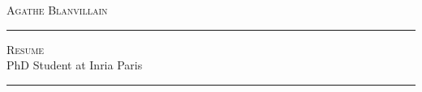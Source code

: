 \documentclass[10pt,A4]{article}
\newcommand{\cvsection}[1]
{
	\begin{center}
		\large\textcolor{sectcol}{\textbf{#1}}
	\end{center}
}
\begin{document}
	
	
	\pagestyle{fancy}	
	
	
	
	
	
	
	
	
	\vspace{-8pt}
	\begin{center}
		\HUGE \textsc{Agathe Blanvillain} \textcolor{sectcol}{\rule[-1mm]{1mm}{0.9cm}} \textsc{Resume}\\[2pt]
		\small PhD Student at Inria Paris
	\end{center}
	
	
	
	\vspace{6pt}
	
	

	\vspace{-2pt}
	\textcolor{softcol}{\hrule}
	\vspace{6pt}
	
	\normalsize
	
	
\end{document}
